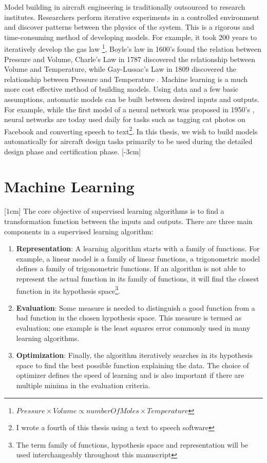 Model building in aircraft engineering is traditionally outsourced to research institutes. Researchers perform iterative experiments in a controlled environment and discover patterns between the physics of the system. This is a rigorous and time-consuming method of developing models. For example, it took 200 years to iteratively develop the gas law \footnote{$Pressure \times Volume \propto numberOfMoles \times Temperature$}, Boyle's law in 1600's found the relation between Pressure and Volume, Charle's Law in 1787 discovered the relationship between Volume and Temperature, while Gay-Lussac's Law in 1809 discovered the relationship between Pressure and Temperature \cite{clapeyron1834memoire}. Machine learning is a much more cost effective  method of building models. Using data and a few basic assumptions, automatic models can be built between desired inputs and outputs. For example, while the first model of a neural network was proposed in 1950's \cite{mcculloch1943logical, rosenblatt1958perceptron}, neural networks are today used daily for tasks such as tagging cat photos on Facebook and converting speech to text\footnote{I wrote a fourth of this thesis using a text to speech software}. In this thesis, we wish to build models automatically for aircraft design tasks primarily to be used during the detailed design phase and certification phase. 
[-3cm]

\section{Machine Learning}\label{secMachineLearning}
[1cm]
The core objective of supervised learning algorithms is to find a transformation function between the inputs and outputs. There are three main components in a supervised learning algorithm:
\begin{enumerate}
\item \textbf{Representation}: A learning algorithm starts with a family of functions. For example, a linear model is a family of linear functions, a trigonometric model defines a family of trigonometric functions. If an algorithm is not able to represent the actual function in its family of functions, it will find the closest function in its hypothesis space\footnote{The term family of functions, hypothesis space and representation will be used interchangeably throughout this manuscript}.
\item \textbf{Evaluation}: Some measure is needed to distinguish a good function from a bad function in the chosen hypothesis space. This measure is termed as evaluation; one example is the least squares error commonly used in many learning algorithms. 
\item \textbf{Optimization}: Finally, the algorithm iteratively searches in its hypothesis space to find the best possible function explaining the data. The choice of optimizer defines the speed of learning and is also important if there are multiple minima in the evaluation criteria.
\end{enumerate}

